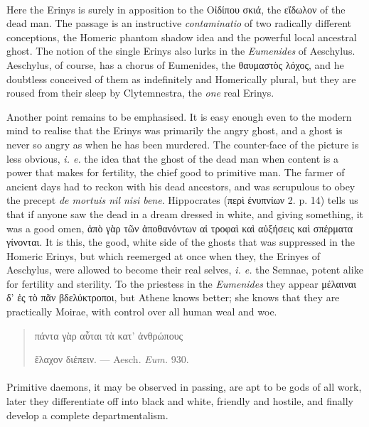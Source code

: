 \documentclass[a4paper, 11pt, oneside, polutonikogreek, english]{article}
\begin{document}
\paragraph{}
Here the Erinys is surely in apposition to the Οἰδίπου σκιά, the εἴδωλον of the dead man. The passage is an instructive \emph{contaminatio} of two radically different conceptions, the Homeric phantom shadow idea and the powerful local ancestral ghost. The notion of the single Erinys also lurks in the \emph{Eumenides} of Aeschylus. Aeschylus, of course, has a chorus of Eumenides, the θαυμαστὸς λόχος, and he doubtless conceived of them as indefinitely and Homerically plural, but they are roused from their sleep by Clytemnestra, the \emph{one} real Erinys.

Another point remains to be emphasised. It is easy enough even to the modern mind to realise that the Erinys was primarily the angry ghost, and a ghost is never so angry as when he has been murdered. The counter-face of the picture is less obvious, \emph{i. e.} the idea that the ghost of the dead man when content is a power that makes for fertility, the chief good to primitive man. The farmer of ancient days had to reckon with his dead ancestors, and was scrupulous to obey the precept \emph{de mortuis nil nisi bene}. Hippocrates (περὶ ἐνυπνίων 2. p. 14) tells us that if anyone saw the dead in a dream dressed in white, and giving something, it was a good omen, ἀπὸ γὰρ τῶν ἀποθανόντων αἱ τροφαὶ καὶ αὐξήσεις καὶ σπέρματα γίνονται. It is this, the good, white side of the ghosts that was suppressed in the Homeric Erinys, but which reemerged at once when they, the Erinyes of Aeschylus, were allowed to become their real selves, \emph{i. e.} the Semnae, potent alike for fertility and sterility. To the priestess in the \emph{Eumenides} they appear μέλαιναι δ' ἐς τὸ πᾶν βδελύκτροποι, but Athene knows better; she knows that they are practically Moirae, with control over all human weal and woe.
\begin{quotation}
πάντα γὰρ αὗται τὰ κατ' ἀνθρώπους

ἔλαχον διέπειν. --- Aesch. \emph{Eum.} 930.
\end{quotation}
\paragraph{}
Primitive daemons, it may be observed in passing, are apt to be gods of all work, later they differentiate off into black and white, friendly and hostile, and finally develop a complete departmentalism.
\end{document}
